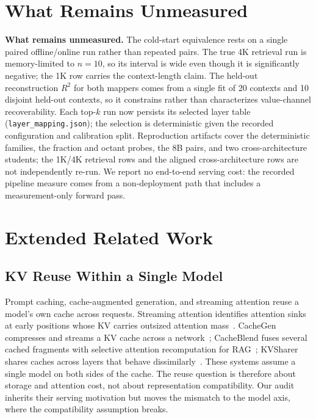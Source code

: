 \documentclass{article} %
\begin{document}
\section{What Remains Unmeasured}
\label{app:unmeasured}

\textbf{What remains unmeasured.} The cold-start equivalence rests on a single
paired offline/online run rather than repeated pairs. The true 4K retrieval run
is memory-limited to $n{=}10$, so its interval is wide even though it is
significantly negative; the 1K row carries the context-length claim. The
held-out reconstruction
$R^2$ for both mappers comes from a single fit of 20 contexts and 10 disjoint
held-out contexts, so it constrains rather than characterizes value-channel
recoverability. Each top-$k$ run now persists its selected layer table
(\texttt{layer\_mapping.json}); the selection is deterministic given the
recorded configuration and calibration split. Reproduction artifacts cover the
deterministic families, the fraction and octant probes, the 8B pairs, and two
cross-architecture students; the 1K/4K retrieval rows and the aligned
cross-architecture rows are not independently re-run. We report no end-to-end
serving cost: the recorded pipeline measure comes from a non-deployment path
that includes a measurement-only forward pass.

\section{Extended Related Work}
\label{app:extsurvey}

\subsection{KV Reuse Within a Single Model}
Prompt caching, cache-augmented generation, and streaming attention reuse a
model's own cache across requests. Streaming attention identifies attention
sinks at early positions whose KV carries outsized attention
mass~\citep{streamingsink2023}. CacheGen compresses and streams a KV cache
across a network~\citep{cachegen2024}; CacheBlend fuses several cached
fragments with selective attention recomputation for
RAG~\citep{cacheblend2025}; KVSharer shares caches across layers that behave
dissimilarly~\citep{kvsharer2024}. These systems assume a single model on
both sides of the cache. The reuse question is therefore about storage and
attention cost, not about representation compatibility. Our audit inherits
their serving motivation but moves the mismatch to the model axis, where the
compatibility assumption breaks.
\end{document}
